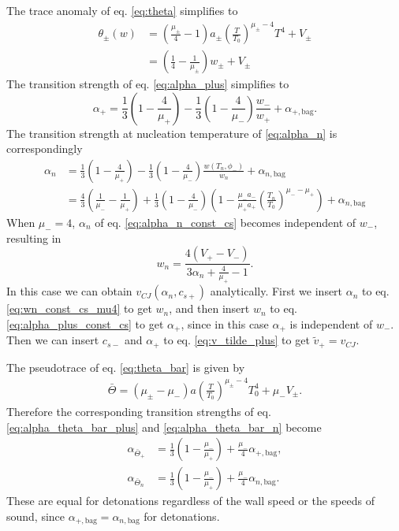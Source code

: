 The trace anomaly of eq. \eqref{eq:theta} simplifies to
\begin{align}
\theta_\pm(w)
&= \left( \frac{\mu_\pm}{4} - 1 \right) a_\pm \left( \frac{T}{T_0} \right)^{\mu_\pm - 4} T^4 + V_\pm \\
&= \left( \frac{1}{4} - \frac{1}{\mu_\pm} \right) w_\pm + V_\pm
\label{eq:theta_const_cs}
\end{align}
The transition strength of eq. \eqref{eq:alpha_plus} simplifies to
\begin{equation}
\alpha_+ = \frac{1}{3} \left( 1 - \frac{4}{\mu_+} \right) - \frac{1}{3} \left(1 - \frac{4}{\mu_-} \right) \frac{w_-}{w_+} + \alpha_{+,\text{bag}}.
\label{eq:alpha_plus_const_cs}
\end{equation}
The transition strength at nucleation temperature of \eqref{eq:alpha_n} is correspondingly
\begin{align}
\alpha_n &= \frac{1}{3} \left( 1 - \frac{4}{\mu_+} \right) - \frac{1}{3} \left(1 - \frac{4}{\mu_-} \right) \frac{w(T_n, \phi_-)}{w_n} + \alpha_{n,\text{bag}} \\
&= \frac{4}{3} \left( \frac{1}{\mu_-} - \frac{1}{\mu_+} \right) + \frac{1}{3} \left( 1 - \frac{4}{\mu_-} \right)
\left( 1 - \frac{\mu_- a_-}{\mu_+ a_+} \left( \frac{T_n}{T_0} \right)^{\mu_- - \mu_+} \right) + \alpha_{n,\text{bag}}
\label{eq:alpha_n_const_cs}
\end{align}
When $\mu_- = 4$, $\alpha_n$ of eq. \eqref{eq:alpha_n_const_cs} becomes independent of $w_-$, resulting in
\begin{equation}
w_n = \frac{4 (V_+ - V_-)}{3 \alpha_n + \frac{4}{\mu_+} - 1}.
\label{eq:wn_const_cs_mu4}
\end{equation}
In this case we can obtain $v_{CJ}(\alpha_n, c_{s+})$ analytically.
First we insert $\alpha_n$ to eq. \eqref{eq:wn_const_cs_mu4} to get $w_n$,
and then insert $w_n$ to eq. \eqref{eq:alpha_plus_const_cs} to get $\alpha_+$,
since in this case $\alpha_+$ is independent of $w_-$.
Then we can insert $c_{s-}$ and $\alpha_+$ to eq. \eqref{eq:v_tilde_plus} to get $\tilde{v}_+ = v_{CJ}$.

The pseudotrace of eq. \eqref{eq:theta_bar} is given by
\begin{align}
\bar{\Theta} = (\mu_\pm - \mu_-) a \left(\frac{T}{T_0}\right)^{\mu_\pm - 4} T_0^4 + \mu_- V_\pm.
\end{align}
Therefore the corresponding transition strengths of eq. \eqref{eq:alpha_theta_bar_plus} and \eqref{eq:alpha_theta_bar_n} become
\begin{align}
\alpha_{\bar{\Theta}_+} &= \frac{1}{3} \left(1 - \frac{\mu_-}{\mu_+}\right) + \frac{\mu_-}{4} \alpha_{+,\text{bag}}, \\
\alpha_{\bar{\Theta}_n} &= \frac{1}{3} \left(1 - \frac{\mu_-}{\mu_+}\right) + \frac{\mu_-}{4} \alpha_{n,\text{bag}}.
\end{align}
These are equal for detonations regardless of the wall speed or the speeds of sound,
since $\alpha_{+,\text{bag}} = \alpha_{n,\text{bag}}$ for detonations.

